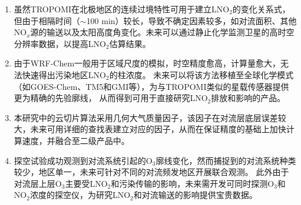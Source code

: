 \begin{enumerate}[label=（\arabic*）, labelindent=\parindent, leftmargin=0pt, widest=0, itemindent=*, topsep=0pt, partopsep=0pt, parsep=0pt]

\item 虽然TROPOMI在北极地区的连续过境特性可用于建立LNO$_2$的变化关系式，但由于相隔时间（$\sim$100 min）较长，导致不确定因素较多，如对流面积、其他NO$_x$源的输送以及太阳高度角变化。未来可以通过静止化学监测卫星的高时空分辨率数据，以提高LNO$_2$估算结果。

\item 由于WRF-Chem一般用于区域尺度的模拟，时空精度愈高，计算量愈大，无法快速得出污染地区LNO$_2$的柱浓度。
未来可以将该方法移植至全球化学模式（如GOES-Chem、TM5和GMI等），为与TROPOMI类似的星载传感器提供更为精确的先验廓线，
从而得到可用于直接研究LNO$_2$排放和影响的产品。

\item 本研究中的云切片算法采用几何大气质量因子，该因子在对流层底层误差较大，未来可用详细的查找表建立对应的因子，从而在保证精度的基础上加快计算速度，并融合至二级产品中。

\item 探空试验成功观测到对流系统引起的O$_3$廓线变化，然而捕捉到的对流系统种类较少，地区单一，未来可针对不同的对流频发地区开展联合观测。
此外由于对流层上层O$_3$主要受LNO$_2$和污染传输的影响，未来需开发可同时探测O$_3$和NO$_2$浓度的探空仪，为研究LNO$_2$和对流输送的影响提供宝贵数据。

\end{enumerate}
